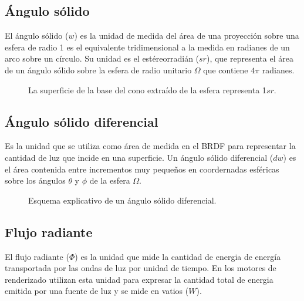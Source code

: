     \subsection*{\'Angulo s\'olido}
    El \'angulo s\'olido ($w$) es la unidad de medida del \'area de una proyecci\'on sobre una esfera de radio 1  es el
    equivalente tridimensional a la medida en radianes de un arco sobre un c\'irculo. Su unidad es el est\'ereorradi\'an
    ($sr$), que representa el \'area de un \'angulo s\'olido sobre la esfera de radio unitario $\Omega$ que contiene $4\pi$ radianes.

    \begin{figure}[H]
        \centering
        \caption{La superficie de la base del cono extra\'ido de la esfera representa 1$sr$.}
        \vspace{0.5cm}
    \end{figure}

    \subsection*{\'Angulo s\'olido diferencial}
    Es la unidad que se utiliza como \'area de medida en el BRDF para representar la cantidad de luz que incide en una superficie.
    Un \'angulo s\'olido diferencial ($dw$) es el \'area contenida entre incrementos muy peque\~nos en coordernadas esf\'ericas sobre
    los \'angulos $\theta$ y $\phi$ de la esfera $\Omega$.

    \begin{figure}[H]
        \vspace{0.5cm}
        \centering
        \caption{Esquema explicativo de un \'angulo s\'olido diferencial.}
        \vspace{0.5cm}
    \end{figure}


    \subsection*{Flujo radiante}
        El flujo radiante ($\Phi$) es la unidad que mide la  cantidad de energia de energ\'ia transportada
        por las ondas de luz por unidad de tiempo. En los motores de renderizado utilizan esta unidad para expresar la cantidad
        total de energia emitida por una fuente de luz y se mide en vatios ($W$).


